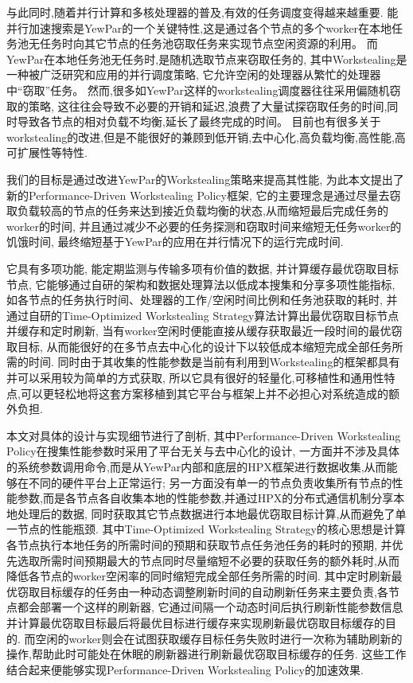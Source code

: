 \documentclass{mproj}
\begin{document}
与此同时,随着并行计算和多核处理器的普及,有效的任务调度变得越来越重要.
能并行加速搜索是YewPar的一个关键特性,这是通过各个节点的多个worker在本地任务池无任务时向其它节点的任务池窃取任务来实现节点空闲资源的利用。
而YewPar在本地任务池无任务时,是随机选取节点来窃取任务的,
其中Workstealing是一种被广泛研究和应用的并行调度策略,
它允许空闲的处理器从繁忙的处理器中“窃取”任务。
然而,很多如YewPar这样的workstealing调度器往往采用偏随机窃取的策略,
这往往会导致不必要的开销和延迟,浪费了大量试探窃取任务的时间,同时导致各节点的相对负载不均衡,延长了最终完成的时间。
目前也有很多关于workstealing的改进,但是不能很好的兼顾到低开销,去中心化,高负载均衡,高性能,高可扩展性等特性.

我们的目标是通过改进YewPar的Workstealing策略来提高其性能,
为此本文提出了新的Performance-Driven Workstealing Policy框架,
它的主要理念是通过尽量去窃取负载较高的节点的任务来达到接近负载均衡的状态,从而缩短最后完成任务的worker的时间,
并且通过减少不必要的任务探测和窃取时间来缩短无任务worker的饥饿时间,
最终缩短基于YewPar的应用在并行情况下的运行完成时间.

它具有多项功能,
能定期监测与传输多项有价值的数据,
并计算缓存最优窃取目标节点,
它能够通过自研的架构和数据处理算法以低成本搜集和分享多项性能指标,
如各节点的任务执行时间、处理器的工作/空闲时间比例和任务池获取的耗时,
并通过自研的Time-Optimized Workstealing Strategy算法计算出最优窃取目标节点并缓存和定时刷新,
当有worker空闲时便能直接从缓存获取最近一段时间的最优窃取目标,
从而能很好的在多节点去中心化的设计下以较低成本缩短完成全部任务所需的时间.
同时由于其收集的性能参数是当前有利用到Workstealing的框架都具有并可以采用较为简单的方式获取,
所以它具有很好的轻量化,可移植性和通用性特点,可以更轻松地将这套方案移植到其它平台与框架上并不必担心对系统造成的额外负担.

本文对具体的设计与实现细节进行了剖析,
其中Performance-Driven Workstealing Policy在搜集性能参数时采用了平台无关与去中心化的设计,
一方面并不涉及具体的系统参数调用命令,而是从YewPar内部和底层的HPX\cite{10.1145/2676870.2676883}框架进行数据收集,从而能够在不同的硬件平台上正常运行;
另一方面没有单一的节点负责收集所有节点的性能参数,而是各节点各自收集本地的性能参数,并通过HPX的分布式通信机制分享本地处理后的数据,
同时获取其它节点数据进行本地最优窃取目标计算,从而避免了单一节点的性能瓶颈.
其中Time-Optimized Workstealing Strategy的核心思想是计算各节点执行本地任务的所需时间的预期和获取节点任务池任务的耗时的预期,
并优先选取所需时间预期最大的节点同时尽量缩短不必要的获取任务的额外耗时,从而降低各节点的worker空闲率的同时缩短完成全部任务所需的时间.
其中定时刷新最优窃取目标缓存的任务由一种动态调整刷新时间的自动刷新任务来主要负责,各节点都会部署一个这样的刷新器,
它通过间隔一个动态时间后执行刷新性能参数信息并计算最优窃取目标最后将最优目标进行缓存来实现刷新最优窃取目标缓存的目的.
而空闲的worker则会在试图获取缓存目标任务失败时进行一次称为辅助刷新的操作,帮助此时可能处在休眠的刷新器进行刷新最优窃取目标缓存的任务.
这些工作结合起来便能够实现Performance-Driven Workstealing Policy的加速效果.
\end{document}
